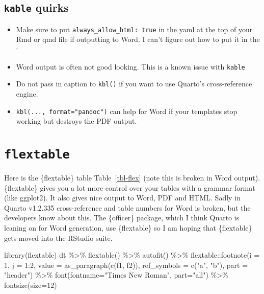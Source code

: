 \documentclass[
  letterpaper,
  oneside]{scrbook}
\newenvironment{Shaded}{\begin{snugshade}}{\end{snugshade}}
\newcommand{\AttributeTok}[1]{\textcolor[rgb]{0.40,0.45,0.13}{#1}}
\newcommand{\DecValTok}[1]{\textcolor[rgb]{0.68,0.00,0.00}{#1}}
\newcommand{\FunctionTok}[1]{\textcolor[rgb]{0.28,0.35,0.67}{#1}}
\newcommand{\NormalTok}[1]{\textcolor[rgb]{0.00,0.23,0.31}{#1}}
\newcommand{\SpecialCharTok}[1]{\textcolor[rgb]{0.37,0.37,0.37}{#1}}
\newcommand{\StringTok}[1]{\textcolor[rgb]{0.13,0.47,0.30}{#1}}
\providecommand{\tightlist}{%
  \setlength{\itemsep}{0pt}\setlength{\parskip}{0pt}}\usepackage{longtable,booktabs,array}
\begin{document}
\hypertarget{kable-quirks}{%
\subsection{\texorpdfstring{\texttt{kable}
quirks}{kable quirks}}\label{kable-quirks}}

\begin{itemize}
\tightlist
\item
  Make sure to put \texttt{always\_allow\_html:\ true} in the yaml at
  the top of your Rmd or qmd file if outputting to Word. I can't figure
  out how to put it in the `
\item
  Word output is often not good looking. This is a known issue with
  \texttt{kable}
\item
  Do not pass in caption to \texttt{kbl()} if you want to use Quarto's
  cross-reference engine.
\item
  \texttt{kbl(...,\ format="pandoc")} can help for Word if your
  templates stop working but destroys the PDF output.
\end{itemize}

\hypertarget{flextable}{%
\section{\texorpdfstring{\texttt{flextable}}{flextable}}\label{flextable}}

Here is the \{flextable\} table Table~\ref{tbl-flex} (note this is
broken in Word output). \{flextable\} gives you a lot more control over
your tables with a grammar format (like ggplot2). It also gives nice
output to Word, PDF and HTML. Sadly in Quarto v1.2.335 cross-reference
and table numbers for Word is broken, but the developers know about
this. The \{officer\} package, which I think Quarto is leaning on for
Word generation, use \{flextable\} so I am hoping that \{flextable\}
gets moved into the RStudio suite.

\begin{Shaded}
\begin{Highlighting}[]
\FunctionTok{library}\NormalTok{(flextable)}
\NormalTok{dt }\SpecialCharTok{\%\textgreater{}\%}
  \FunctionTok{flextable}\NormalTok{() }\SpecialCharTok{\%\textgreater{}\%}
  \FunctionTok{autofit}\NormalTok{() }\SpecialCharTok{\%\textgreater{}\%}
\NormalTok{  flextable}\SpecialCharTok{::}\FunctionTok{footnote}\NormalTok{(}\AttributeTok{i =} \DecValTok{1}\NormalTok{, }\AttributeTok{j =} \DecValTok{1}\SpecialCharTok{:}\DecValTok{2}\NormalTok{,}
            \AttributeTok{value =} \FunctionTok{as\_paragraph}\NormalTok{(}\FunctionTok{c}\NormalTok{(f1, f2)),}
            \AttributeTok{ref\_symbols =} \FunctionTok{c}\NormalTok{(}\StringTok{"a"}\NormalTok{, }\StringTok{"b"}\NormalTok{),}
            \AttributeTok{part =} \StringTok{"header"}\NormalTok{) }\SpecialCharTok{\%\textgreater{}\%}
  \FunctionTok{font}\NormalTok{(}\AttributeTok{fontname=}\StringTok{"Times New Roman"}\NormalTok{, }\AttributeTok{part=}\StringTok{"all"}\NormalTok{) }\SpecialCharTok{\%\textgreater{}\%}
  \FunctionTok{fontsize}\NormalTok{(}\AttributeTok{size=}\DecValTok{12}\NormalTok{)}
\end{Highlighting}
\end{Shaded}
\end{document}
